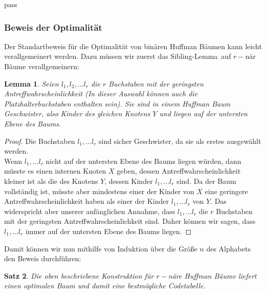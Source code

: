 pass\documentclass[a4paper,10pt,ngerman]{scrartcl}
\newtheorem{satz}{Satz}
\newtheorem{lemma}[satz]{Lemma}
\begin{document}
    \subsubsection{Beweis der Optimalität}
    Der Standartbeweis für die Optimalität von binären Huffman Bäumen kann leicht verallgemeinert werden.
    Dazu müssen wir zuerst das \glqq Sibling-Lemma\grqq~auf $r-$när Bäume verallgemeinern:
    \begin{lemma}
        Seien $l_1, l_2, \dots l_r$ die $r$ Buchstaben mit der geringsten Antreffwahrscheinlichkeit (In dieser Auswahl können auch die Platzhalterbuchstaben enthalten sein).
        Sie sind in einem Huffman Baum \glqq Geschwister\grqq, also Kinder des gleichen Knotens $Y$ und liegen auf der untersten Ebene des Baums.
    \end{lemma}
    \begin{proof}
        Die Buchstaben $l_1, \dots l_r$ sind sicher Geschwister, da sie als erstes ausgewählt werden. \\
        Wenn $l_1, \dots l_r$ nicht auf der untersten Ebene des Baums liegen würden, dann müsste es einen internen Knoten $X$ geben, dessen Antreffwahrscheinlichkeit kleiner ist als die des Knotens $Y$, dessen Kinder $l_1, \dots l_r$ sind.
        Da der Baum vollständig ist, müsste aber mindestens einer der Kinder von $X$ eine geringere Antreffwahrscheinlichkeit haben als einer der Kinder  $l_1, \dots l_r$ von $Y$.
        Das widerspricht aber unserer anfänglichen Annahme, dass $l_1, \dots l_r$ die $r$ Buchstaben mit der geringsten Antreffwahrscheinlichkeit sind. Daher können wir sagen, dass $l_1, \dots l_r$ immer auf der untersten Ebene des Baums liegen.
    \end{proof}
    Damit können wir nun mithilfe von Induktion über die Größe $n$ des Alphabets den Beweis durchführen:
    \begin{satz}
        Die oben beschriebene Konstruktion für $r-$näre Huffman Bäume liefert einen optimalen Baum und damit eine bestmögliche Codetabelle.
    \end{satz}
\end{document}
